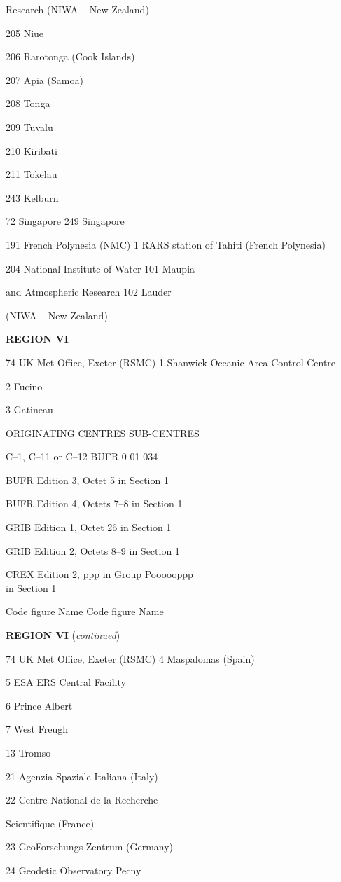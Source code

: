Research (NIWA -- New Zealand)

205 Niue

206 Rarotonga (Cook Islands)

207 Apia (Samoa)

208 Tonga

209 Tuvalu

210 Kiribati

211 Tokelau

243 Kelburn

72 Singapore 249 Singapore

191 French Polynesia (NMC) 1 RARS station of Tahiti (French Polynesia)

204 National Institute of Water 101 Maupia

and Atmospheric Research 102 Lauder

(NIWA -- New Zealand)

\textbf{REGION VI}

74 UK Met Office, Exeter (RSMC) 1 Shanwick Oceanic Area Control Centre

2 Fucino

3 Gatineau

ORIGINATING CENTRES SUB-CENTRES

C--1, C--11 or C--12 BUFR 0 01 034

BUFR Edition 3, Octet 5 in Section 1

BUFR Edition 4, Octets 7--8 in Section 1

GRIB Edition 1, Octet 26 in Section 1

GRIB Edition 2, Octets 8--9 in Section 1

CREX Edition 2, ppp in Group Poooooppp\\
in Section 1

Code figure Name Code figure Name

\textbf{REGION VI} (\emph{continued})

74 UK Met Office, Exeter (RSMC) 4 Maspalomas (Spain)

5 ESA ERS Central Facility

6 Prince Albert

7 West Freugh

13 Tromso

21 Agenzia Spaziale Italiana (Italy)

22 Centre National de la Recherche

Scientifique (France)

23 GeoForschungs Zentrum (Germany)

24 Geodetic Observatory Pecny

